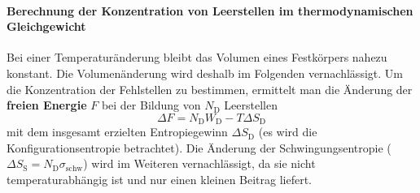 \paragraph{Berechnung der Konzentration von Leerstellen im thermodynamischen Gleichgewicht} 
	Bei einer Temperaturänderung bleibt das Volumen eines Festkörpers nahezu konstant.
	Die Volumenänderung wird deshalb im Folgenden vernachlässigt.
	Um die Konzentration der Fehlstellen zu bestimmen, ermittelt man die Änderung der \textbf{freien Energie} $F$ bei der Bildung von $N_\mathrm{D}$ Leerstellen
	\begin{equation}
		\label{eq:II.4.1}
		\Delta F = N_\mathrm{D} W_\mathrm{D} - T \Delta S_\mathrm{D}
	\end{equation}
	mit dem insgesamt erzielten Entropiegewinn $\Delta S_\mathrm{D}$ (es wird die Konfigurationsentropie betrachtet). 
	Die Änderung der Schwingungsentropie ($\Delta S_\mathrm{S} = N_\mathrm{D} \sigma_{\text{schw}}$) wird im Weiteren vernachlässigt, da sie nicht temperaturabhängig ist und nur einen kleinen Beitrag liefert.

